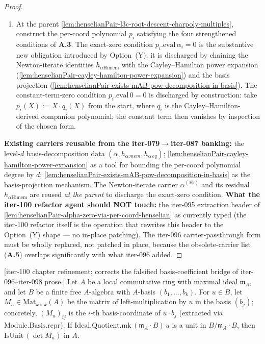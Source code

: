 \begin{proof}
\begin{enumerate}
the derivative-unit hypothesis to $q_i.\mathrm{eval}\,\alpha_i$
(modulo $\mathfrak m_A$, then in $A$ via
\texttt{IsLocalRing.notMem\_maximalIdeal}), and cancel.
\item At the parent
\cref{lem:henselianPair-l3c-root-descent-charpoly-multiples},
construct the per-coord polynomial $p_i$ satisfying the four
strengthened conditions of \textbf{A.3}. The exact-zero condition
$p_i.\mathrm{eval}\,\alpha_i = 0$ is the substantive new
obligation introduced by Option~(Y); it is discharged by chaining
the Newton-iterate identities $h_{\alpha\mathrm{Hi}\mathrm{mem}}$
with the Cayley--Hamilton power expansion (\cref{lem:henselianPair-cayley-hamilton-power-expansion})
and the basis projection
(\cref{lem:henselianPair-exists-mAB-pow-decomposition-in-basis}).
The constant-term-zero condition $p_i.\mathrm{eval}\,0 = 0$ is
discharged by construction: take $p_i(X) := X \cdot q_i(X)$ from
the start, where $q_i$ is the Cayley--Hamilton-derived companion
polynomial; the constant term then vanishes by inspection of the
chosen form.
\end{enumerate}
\textbf{Existing carriers reusable from the iter-079$\to$iter-087
banking:} the level-$d$ basis-decomposition data
$(\alpha, h_{\alpha\,mem}, h_{\alpha\,eq})$;
\cref{lem:henselianPair-cayley-hamilton-power-expansion} as a tool
for bounding the per-coord polynomial degree by $d$;
\cref{lem:henselianPair-exists-mAB-pow-decomposition-in-basis} as
the basis-projection mechanism. The Newton-iterate carrier
$\alpha^{(\mathrm{Hi})}$ and its residual
$h_{\alpha\mathrm{Hi}\mathrm{mem}}$ are reused
\emph{at the parent} to discharge the exact-zero condition.
\textbf{What the iter-100 refactor agent should NOT touch:} the
iter-095 extraction header of
\cref{lem:henselianPair-alpha-zero-via-per-coord-henselian} as
currently typed (the iter-100 refactor itself is the operation
that rewrites this header to the Option~(Y) shape — no in-place
patching). The iter-096 carrier-passthrough form must be wholly
replaced, not patched in place, because the obsolete-carrier list
(\textbf{A.5}) overlaps significantly with what iter-096 added.
\end{proof}

\begin{lemma}
\label{lem:henselianPair-mult-det-isUnit-of-isUnit-mod-maximal}
[iter-100 chapter refinement; corrects the falsified
basis-coefficient bridge of iter-096--iter-098 prose.]
Let $A$ be a local commutative ring with maximal ideal
$\mathfrak m_A$, and let $B$ be a finite free $A$-algebra with
$A$-basis $(b_1, \ldots, b_k)$. For $u \in B$, let
$M_u \in \mathrm{Mat}_{k\times k}(A)$ be the matrix of
left-multiplication by $u$ in the basis $(b_j)$; concretely,
$(M_u)_{ij}$ is the $i$-th basis-coordinate of $u \cdot b_j$
(extracted via $\mathrm{Module.Basis.repr}$). If
$\mathrm{Ideal.Quotient.mk}\,(\mathfrak m_A \cdot B)\,u$ is a
unit in $B / \mathfrak m_A \cdot B$, then
$\mathrm{IsUnit}\,(\det M_u)$ in $A$.
\end{lemma}

